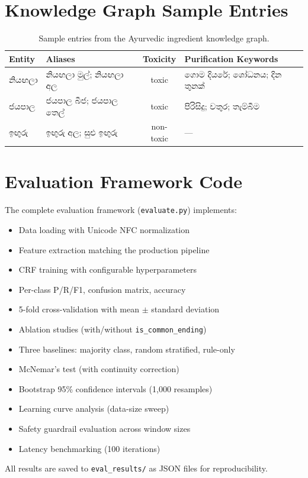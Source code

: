 \documentclass[12pt, a4paper, twoside]{report}
\begin{document}
\begin{appendices}
\chapter{Knowledge Graph Sample Entries}
\label{app:kg}

\begin{table}[htbp]
\centering
\caption{Sample entries from the Ayurvedic ingredient knowledge graph.}
\label{tab:kg-sample}
\begin{tabular}{p{2cm}p{3cm}cp{3.5cm}}
\toprule
\textbf{Entity} & \textbf{Aliases} & \textbf{Toxicity} & \textbf{Purification Keywords} \\
\midrule
නියඟලා & නියඟලා මුල්; නියඟලා අල & toxic & ගොම දියරේ; ශෝධනය; දින තුනක් \\
ජයපාල & ජයපාල බීජ; ජයපාල තෙල් & toxic & පිරිසිදු; වතුර; තැම්බීම \\
ඉඟුරු & ඉඟුරු අල; සුළු ඉඟුරු & non-toxic & --- \\
\bottomrule
\end{tabular}
\end{table}


\chapter{Evaluation Framework Code}
\label{app:eval-code}

The complete evaluation framework (\texttt{evaluate.py}) implements:

\begin{itemize}
    \item Data loading with Unicode NFC normalization
    \item Feature extraction matching the production pipeline
    \item CRF training with configurable hyperparameters
    \item Per-class P/R/F1, confusion matrix, accuracy
    \item 5-fold cross-validation with mean $\pm$ standard deviation
    \item Ablation studies (with/without \texttt{is\_common\_ending})
    \item Three baselines: majority class, random stratified, rule-only
    \item McNemar's test (with continuity correction)
    \item Bootstrap 95\% confidence intervals (1,000 resamples)
    \item Learning curve analysis (data-size sweep)
    \item Safety guardrail evaluation across window sizes
    \item Latency benchmarking (100 iterations)
\end{itemize}

All results are saved to \texttt{eval\_results/} as JSON files for reproducibility.

\end{appendices}
\end{document}
